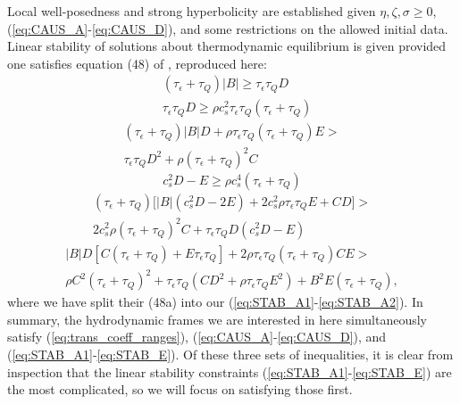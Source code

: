 \documentclass[%
notitlepage,
superscriptaddress,
nofootinbib,
amsmath,
amssymb,
aps,
twocolumn
]{revtex4-1}
\begin{document}
Local well-posedness and strong hyperbolicity are established given $\eta, \zeta, \sigma \geq 0$, (\ref{eq:CAUS_A}-\ref{eq:CAUS_D}), and some restrictions on the allowed initial data.  Linear stability of solutions about thermodynamic equilibrium is given provided one satisfies equation (48) of \cite{Bemfica:2020zjp}, reproduced here:
\begin{align}
&(\tau_{\epsilon} + \tau_{Q}) |B| \geq \tau_{\epsilon} \tau_{Q} D \tag{STAB A1} \label{eq:STAB_A1}\\
&\tau_{\epsilon} \tau_{Q} D \geq \rho c_s^2 \tau_{\epsilon} \tau_{Q} (\tau_{\epsilon} + \tau_{Q}) \tag{STAB A2} \label{eq:STAB_A2} 
\end{align}
\begin{multline}
(\tau_{\epsilon} + \tau_{Q}) |B| D + \rho \tau_{\epsilon} \tau_{Q} (\tau_{\epsilon} + \tau_{Q}) E > \\
\tau_{\epsilon} \tau_{Q} D^2 + \rho (\tau_{\epsilon} + \tau_{Q})^2 C \tag{STAB B} \label{eq:STAB_B}
\end{multline}
\begin{equation}
c_s^2 D - E \geq \rho c_s^4 (\tau_{\epsilon} + \tau_{Q}) \tag{STAB C} \label{eq:STAB_C}
\end{equation}
\begin{multline}
(\tau_{\epsilon} + \tau_{Q}) \Big[ |B| (c_s^2 D - 2 E) + 2 c_s^2 \rho \tau_{\epsilon} \tau_{Q} E + C D \Big] > \\
2 c_s^2 \rho (\tau_{\epsilon} + \tau_{Q})^2 C + \tau_{\epsilon} \tau_{Q} D (c_s^2 D - E) \tag{STAB D} \label{eq:STAB_D}
\end{multline}
\begin{multline}
|B| D [C (\tau_{\epsilon} + \tau_{Q}) + E \tau_{\epsilon} \tau_{Q}] + 2 \rho \tau_{\epsilon} \tau_{Q} (\tau_{\epsilon} + \tau_{Q}) C E > \\
\rho C^2 (\tau_{\epsilon} + \tau_{Q})^2 + \tau_{\epsilon} \tau_{Q} (C D^2 + \rho \tau_{\epsilon} \tau_{Q} E^2) + B^2 E (\tau_{\epsilon} + \tau_{Q}), \tag{STAB E} \label{eq:STAB_E}
\end{multline}
where we have split their (48a) into our (\ref{eq:STAB_A1}-\ref{eq:STAB_A2}).  In summary, the hydrodynamic frames we are interested in here simultaneously satisfy (\ref{eq:trans_coeff_ranges}), (\ref{eq:CAUS_A}-\ref{eq:CAUS_D}), and (\ref{eq:STAB_A1}-\ref{eq:STAB_E}).  Of these three sets of inequalities, it is clear from inspection that the linear stability constraints (\ref{eq:STAB_A1}-\ref{eq:STAB_E}) are the most complicated, so we will focus on satisfying those first.
\end{document}
